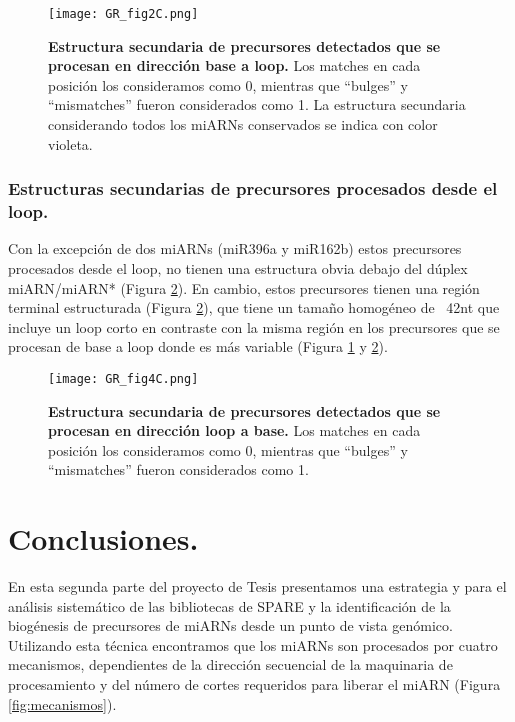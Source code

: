 \begin{figure}[htbp!] 
    \centering    
    \texttt{[image: GR\_fig2C.png]}
    \caption[Estructura secundaria de precursores de base a loop]{
    \textbf{Estructura secundaria de precursores detectados que se procesan en dirección base a loop.}
    Los matches en cada posición los consideramos como 0, mientras que ``bulges'' y ``mismatches'' fueron considerados como 1.
    La estructura secundaria considerando todos los miARNs conservados se indica con color violeta.
    }
    \label{fig:GR_fig2C}
\end{figure}

\subsubsection{Estructuras secundarias de precursores procesados desde el loop.}
Con la excepción de dos miARNs (miR396a y miR162b) estos precursores procesados desde el loop, no tienen una estructura obvia debajo del dúplex miARN/miARN* (Figura \ref{fig:GR_fig4C}).
En cambio, estos precursores tienen una región terminal estructurada (Figura \ref{fig:GR_fig4C}), que tiene un tamaño homogéneo de ~42nt que incluye un loop corto en contraste con la misma región en los precursores que se procesan de base a loop donde es más variable (Figura \ref{fig:GR_fig2C} y \ref{fig:GR_fig4C}). 

\begin{figure}[htbp!] 
    \centering    
    \texttt{[image: GR\_fig4C.png]}
    \caption[Estructura secundaria de precursores de loop a base]{
   \textbf{ Estructura secundaria de precursores detectados que se procesan en dirección loop a base.}
    Los matches en cada posición los consideramos como 0, mientras que ``bulges'' y ``mismatches'' fueron considerados como 1.}
    \label{fig:GR_fig4C}
\end{figure}


\section{Conclusiones.}

En esta segunda parte del proyecto de Tesis presentamos una estrategia y para el análisis sistemático de las bibliotecas de SPARE y la identificación de la biogénesis de precursores de miARNs desde un punto de vista genómico.
Utilizando esta técnica encontramos que los miARNs son procesados por cuatro mecanismos, dependientes de la dirección secuencial de la maquinaria de procesamiento y del número de cortes requeridos para liberar el miARN (Figura \ref{fig:mecanismos}).

